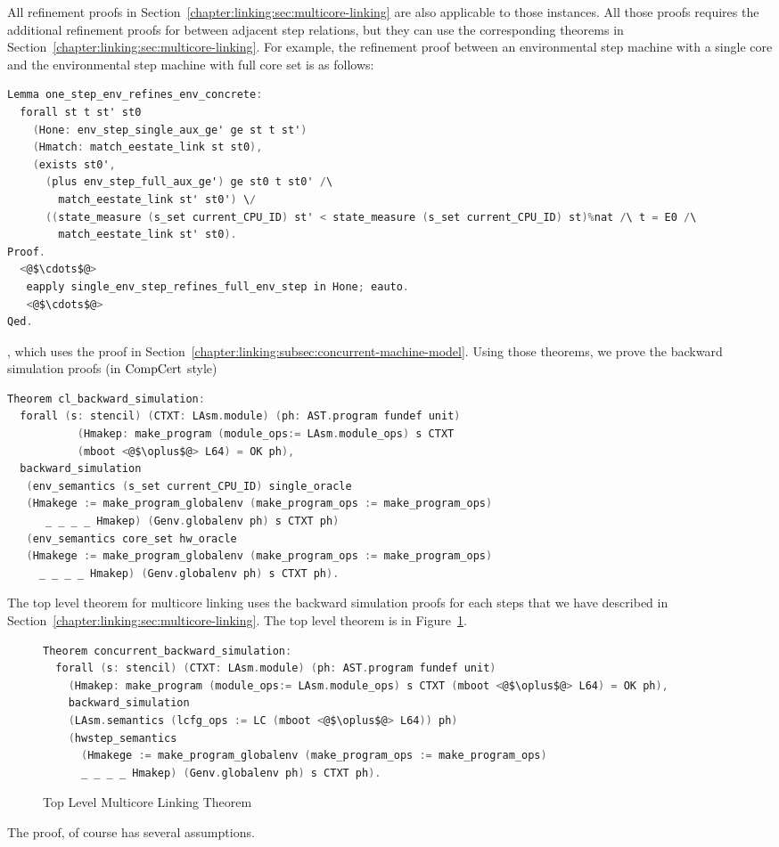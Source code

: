 All refinement proofs in Section~\ref{chapter:linking:sec:multicore-linking} are also applicable 
to those instances. 
All those proofs requires the additional refinement proofs for between adjacent step relations, but they can 
use the corresponding theorems in Section~\ref{chapter:linking:sec:multicore-linking}. 
For example, the refinement proof between an environmental step machine with a single core and the environmental step machine with full core set is 
as follows:
\begin{lstlisting}[language=C]
Lemma one_step_env_refines_env_concrete:
  forall st t st' st0
    (Hone: env_step_single_aux_ge' ge st t st')
    (Hmatch: match_eestate_link st st0),
    (exists st0',
      (plus env_step_full_aux_ge') ge st0 t st0' /\
        match_eestate_link st' st0') \/
      ((state_measure (s_set current_CPU_ID) st' < state_measure (s_set current_CPU_ID) st)%nat /\ t = E0 /\
        match_eestate_link st' st0).
Proof.
  <@$\cdots$@>
   eapply single_env_step_refines_full_env_step in Hone; eauto.
   <@$\cdots$@>
Qed.
\end{lstlisting}
, which uses the proof in Section~\ref{chapter:linking:subsec:concurrent-machine-model}.
Using those theorems, 
we prove the backward simulation proofs (in $\mathrm{CompCert}$ style) 
\begin{lstlisting}[language=C]
Theorem cl_backward_simulation:
  forall (s: stencil) (CTXT: LAsm.module) (ph: AST.program fundef unit)
           (Hmakep: make_program (module_ops:= LAsm.module_ops) s CTXT 
           (mboot <@$\oplus$@> L64) = OK ph),
  backward_simulation
   (env_semantics (s_set current_CPU_ID) single_oracle
   (Hmakege := make_program_globalenv (make_program_ops := make_program_ops)
      _ _ _ _ Hmakep) (Genv.globalenv ph) s CTXT ph)
   (env_semantics core_set hw_oracle
   (Hmakege := make_program_globalenv (make_program_ops := make_program_ops) 
     _ _ _ _ Hmakep) (Genv.globalenv ph) s CTXT ph).
\end{lstlisting}

The top level theorem for multicore linking uses the backward simulation proofs 
for each steps that we have described in Section~\ref{chapter:linking:sec:multicore-linking}.
The top level theorem is in Figure~\ref{fig:chapter:certikos:top-level-multicore-theorem}.

\begin{figure}
\begin{lstlisting}[language=C]
Theorem concurrent_backward_simulation:
  forall (s: stencil) (CTXT: LAsm.module) (ph: AST.program fundef unit)
    (Hmakep: make_program (module_ops:= LAsm.module_ops) s CTXT (mboot <@$\oplus$@> L64) = OK ph),
    backward_simulation
    (LAsm.semantics (lcfg_ops := LC (mboot <@$\oplus$@> L64)) ph)          
    (hwstep_semantics 
      (Hmakege := make_program_globalenv (make_program_ops := make_program_ops) 
      _ _ _ _ Hmakep) (Genv.globalenv ph) s CTXT ph).
\end{lstlisting}
\caption{Top Level Multicore Linking Theorem}
\label{fig:chapter:certikos:top-level-multicore-theorem}
\end{figure}

The proof, of course has several assumptions. 

